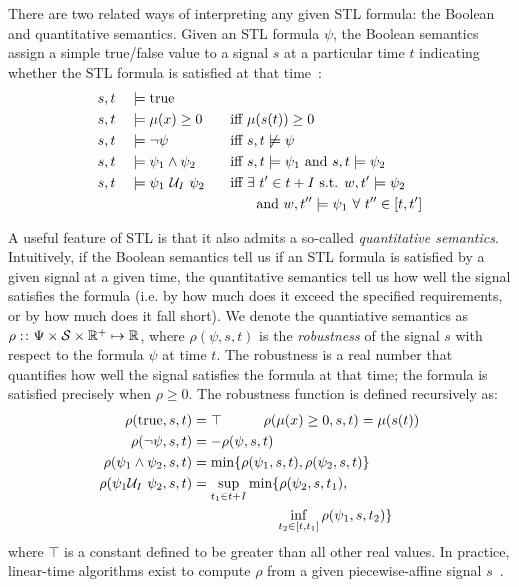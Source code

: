 There are two related ways of interpreting any given STL formula: the Boolean and quantitative semantics. Given an STL formula $\psi$, the Boolean semantics assign a simple true/false value to a signal $s$ at a particular time $t$ indicating whether the STL formula is satisfied at that time~\cite{donzeEfficientRobustMonitoring2013a}:
\begin{alignat*}{3}
     & s, t &  & \models \text{true}              &  &                                                                            \\
     & s, t &  & \models \mu(x) \geq 0\quad       &  & \text{iff}\ \mu(s(t)) \geq 0                                               \\
     & s, t &  & \models \neg \psi                &  & \text{iff}\ s, t \not\models \psi                                          \\
     & s, t &  & \models \psi_1 \wedge \psi_2     &  & \text{iff}\ s, t \models \psi_1 \text{ and } s, t \models \psi_2           \\
     & s, t &  & \models \psi_1\ \mathcal{U}_I\ \psi_2 &  & \text{iff } \exists\ t' \in t + I \text{ s.t. } w, t' \models \psi_2       \\
     &      &  &                                  &  & \phantom{iff} \text{ and } w, t'' \models \psi_1\ \forall\ t'' \in [t, t']
\end{alignat*}

A useful feature of STL is that it also admits a so-called \textit{quantitative semantics}. Intuitively, if the Boolean semantics tell us if an STL formula is satisfied by a given signal at a given time, the quantitative semantics tell us how well the signal satisfies the formula (i.e. by how much does it exceed the specified requirements, or by how much does it fall short). We denote the quantiative semantics as $\rho: \colon \Psi \times \mathcal{S} \times \mathbb{R}^+ \mapsto \mathbb{R}$, where $\rho(\psi, s, t)$ is the \textit{robustness} of the signal $s$ with respect to the formula $\psi$ at time $t$. The robustness is a real number that quantifies how well the signal satisfies the formula at that time; the formula is satisfied precisely when $\rho \geq 0$. The robustness function is defined recursively as:
\begin{align*}
    \rho(\text{true}, s, t)             & = \top \qquad \quad \rho(\mu(x) \geq 0, s, t) = \mu(s(t))           \\
    \rho(\neg\psi, s, t)                & = -\rho(\psi, s, t)                                                 \\
    \rho(\psi_1 \wedge \psi_2, s, t)    & = \min\{\rho(\psi_1, s, t), \rho(\psi_2, s, t)\}                    \\
    \rho(\psi_1 \mathcal{U}_I\ \psi_2, s, t) & = \sup_{t_1 \in t + I} \min\{\rho(\psi_2, s, t_1),                  \\
                                        & \qquad \qquad \qquad \inf_{t_2 \in [t, t_1]} \rho(\psi_1, s, t_2)\}
\end{align*}
where $\top$ is a constant defined to be greater than all other real values. In practice, linear-time algorithms exist to compute $\rho$ from a given piecewise-affine signal $s$~\cite{donzeEfficientRobustMonitoring2013a}.

